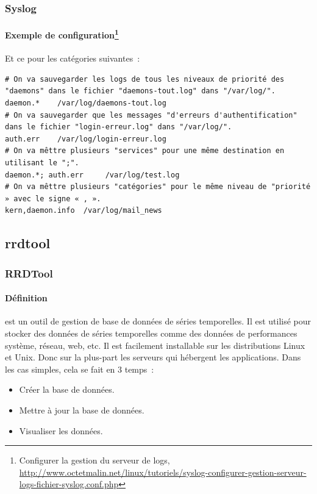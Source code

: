 \documentclass{beamer}
\begin{document}
    \begin{frame}[fragile]
        \transdissolve
        \frametitle{Syslog}
        \framesubtitle{Exemple de configuration\footnote{Configurer la gestion du serveur de logs, \url{http://www.octetmalin.net/linux/tutoriels/syslog-configurer-gestion-serveur-logs-fichier-syslog.conf.php}}}
        Et ce pour les catégories suivantes~:
        \begin{lstlisting}
# On va sauvegarder les logs de tous les niveaux de priorité des "daemons" dans le fichier "daemons-tout.log" dans "/var/log/".
daemon.*	/var/log/daemons-tout.log
# On va sauvegarder que les messages "d'erreurs d'authentification" dans le fichier "login-erreur.log" dans "/var/log/".
auth.err	/var/log/login-erreur.log
# On va mêttre plusieurs "services" pour une même destination en utilisant le ";".
daemon.*; auth.err     /var/log/test.log
# On va mêttre plusieurs "catégories" pour le même niveau de "priorité » avec le signe « , ».
kern,daemon.info  /var/log/mail_news
        \end{lstlisting}
    \end{frame}

    \subsection{rrdtool}\label{subsec:rrdtool}

    \begin{frame}
        \transdissolve
        \frametitle{RRDTool}
        \framesubtitle{Définition}
         est un outil de gestion de base de données de séries temporelles.
        \bigbreak
        Il est utilisé pour stocker des données de séries temporelles comme des données de performances système, réseau, web, etc.
        \bigbreak
        Il est facilement installable sur les distributions Linux et Unix.
        Donc sur la plus-part les serveurs qui hébergent les applications.
        \bigbreak
        Dans les cas simples, cela se fait en 3 temps~:
        \begin{itemize}
            \item Créer la base de données.
            \item Mettre à jour la base de données.
            \item Visualiser les données.
        \end{itemize}
    \end{frame}
\end{document}
